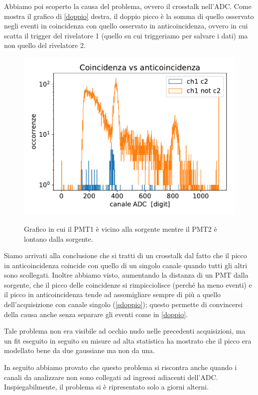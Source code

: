 Abbiamo poi scoperto la causa del problema, ovvero il crosstalk nell'ADC.
Come mostra il grafico di \autoref{doppio} destra, il doppio picco è la somma di quello osservato negli eventi in coincidenza con quello osservato in anticoincidenza,
ovvero in cui scatta il trigger del rivelatore 1 (quello su cui triggeriamo per salvare i dati) ma non quello del rivelatore 2.



\begin{figure}
\centering
\subfloat
{
\includegraphics[width=20 em]{immagini/dist}
}
\caption{Grafico in cui il PMT1 è vicino alla sorgente mentre il PMT2 è lontano dalla sorgente.}
\label{sdoppio}
\end{figure}

Siamo arrivati alla conclusione che si tratti di un crosstalk dal fatto che il picco in anticoincidenza coincide con quello di un singolo canale quando tutti gli altri sono scollegati.
Inoltre abbiamo visto, aumentando la distanza di un PMT dalla sorgente, che il picco delle coincidenze si rimpicciolisce (perché ha meno eventi) e il picco in anticoincidenza tende ad assomigliare sempre di più a quello dell'acquisizione con canale singolo (\autoref{sdoppio});
questo permette di convincersi della causa anche senza separare gli eventi come in \autoref{doppio}.

Tale problema non era visibile ad occhio nudo nelle precedenti acquisizioni, ma un fit eseguito in seguito su misure ad alta statistica ha mostrato che il picco era modellato bene da due gaussiane ma non da una.

In seguito abbiamo provato che questo problema si riscontra anche quando i canali da analizzare non sono collegati ad ingressi adiacenti dell'ADC. Inspiegabilmente, il problema si è ripresentato solo a giorni alterni. 

